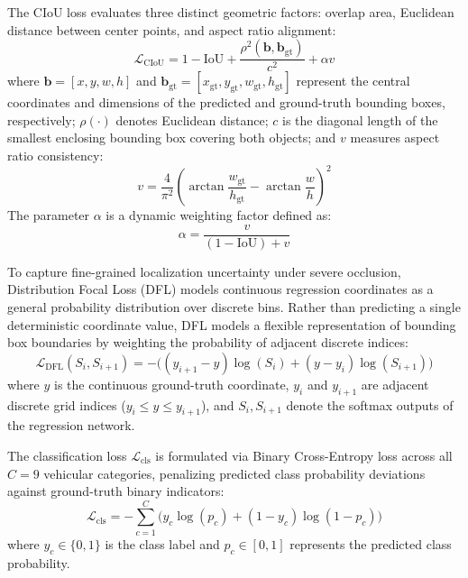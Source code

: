 \documentclass[pdflatex,sn-mathphys]{sn-jnl}
\begin{document}
The CIoU loss evaluates three distinct geometric factors: overlap area, Euclidean distance between center points, and aspect ratio alignment:
\begin{equation}
\mathcal{L}_{\text{CIoU}} = 1 - \text{IoU} + \frac{\rho^2(\mathbf{b}, \mathbf{b}_{\text{gt}})}{c^2} + \alpha v
\label{eq:ciou}
\end{equation}
where $\mathbf{b} = [x, y, w, h]$ and $\mathbf{b}_{\text{gt}} = [x_{\text{gt}}, y_{\text{gt}}, w_{\text{gt}}, h_{\text{gt}}]$ represent the central coordinates and dimensions of the predicted and ground-truth bounding boxes, respectively; $\rho(\cdot)$ denotes Euclidean distance; $c$ is the diagonal length of the smallest enclosing bounding box covering both objects; and $v$ measures aspect ratio consistency:
\begin{equation}
v = \frac{4}{\pi^2} \left( \arctan\frac{w_{\text{gt}}}{h_{\text{gt}}} - \arctan\frac{w}{h} \right)^2
\label{eq:v}
\end{equation}
The parameter $\alpha$ is a dynamic weighting factor defined as:
\begin{equation}
\alpha = \frac{v}{(1 - \text{IoU}) + v}
\label{eq:alpha}
\end{equation}

To capture fine-grained localization uncertainty under severe occlusion, Distribution Focal Loss (DFL) models continuous regression coordinates as a general probability distribution over discrete bins. Rather than predicting a single deterministic coordinate value, DFL models a flexible representation of bounding box boundaries by weighting the probability of adjacent discrete indices:
\begin{equation}
\mathcal{L}_{\text{DFL}}(S_i, S_{i+1}) = - \Big( (y_{i+1} - y)\log(S_i) + (y - y_i)\log(S_{i+1}) \Big)
\label{eq:dfl}
\end{equation}
where $y$ is the continuous ground-truth coordinate, $y_i$ and $y_{i+1}$ are adjacent discrete grid indices ($y_i \le y \le y_{i+1}$), and $S_i, S_{i+1}$ denote the softmax outputs of the regression network.

The classification loss $\mathcal{L}_{\text{cls}}$ is formulated via Binary Cross-Entropy loss across all $C=9$ vehicular categories, penalizing predicted class probability deviations against ground-truth binary indicators:
\begin{equation}
\mathcal{L}_{\text{cls}} = - \sum_{c=1}^{C} \Big( y_c \log(p_c) + (1 - y_c)\log(1 - p_c) \Big)
\label{eq:bce}
\end{equation}
where $y_c \in \{0, 1\}$ is the class label and $p_c \in [0, 1]$ represents the predicted class probability.
\end{document}
